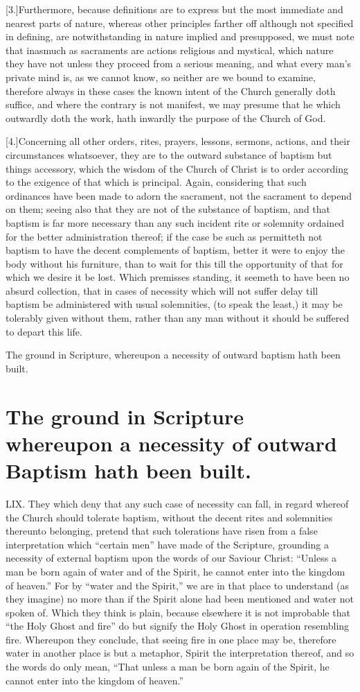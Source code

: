 [3.]Furthermore, because definitions are to express but the  most immediate and nearest parts of nature,
 whereas other principles farther off although not specified in defining, are notwithstanding in nature implied and presupposed, we must note that inasmuch as sacraments are actions religious and mystical, which nature they have not unless they proceed from a serious meaning, and what every man’s private mind is, as we cannot know, so neither are we bound to examine, therefore always in these cases the known intent of the Church generally doth suffice, and where the contrary is not manifest, we may presume that he which outwardly doth the work, hath inwardly the purpose of the Church of God.

[4.]Concerning all other orders, rites, prayers, lessons, sermons, actions, and their circumstances whatsoever, they are to the outward substance of baptism but things accessory, which the wisdom of the Church of Christ is to order according to  the exigence of that which is principal.
 Again, considering that such ordinances have been made to adorn the sacrament, not the sacrament to depend on them; seeing also that they are not of the substance of baptism, and that baptism is far more necessary than any such incident rite or solemnity ordained for the better administration thereof; if the case be such as permitteth not baptism to have the decent complements of baptism, better it were to enjoy the body without his furniture, than to wait for this till the opportunity of that for which we desire it be lost. Which premisses standing, it seemeth to have been no absurd collection, that in cases of necessity which will not suffer delay till baptism be administered with usual solemnities, (to speak the least,) it may be tolerably given without them, rather than any man without it should be suffered to depart this life.


The ground in Scripture, whereupon a necessity of outward baptism hath been built.
\section*{The ground in Scripture whereupon a necessity of outward Baptism hath been built.}
LIX. They which deny that any such case of necessity can fall, in regard whereof the Church should tolerate baptism, without the decent rites and solemnities thereunto belonging, pretend that such tolerations have risen from a false interpretation which “certain men” have made of the Scripture, grounding a necessity of external baptism upon the words of our Saviour Christ: “Unless a man be born again of water and of the Spirit, he cannot enter into the kingdom of heaven.” For by “water and the Spirit,” we are in that  place to understand (as they imagine) no more than if the Spirit alone had been mentioned and water not spoken of.
 Which they think is plain, because elsewhere it is not improbable that “the Holy Ghost and fire” do but signify the Holy Ghost in operation resembling fire. Whereupon they conclude, that seeing fire in one place may be, therefore water in another place is but a metaphor, Spirit the interpretation thereof, and so the words do only mean, “That unless a man be born again of the Spirit, he cannot enter into the kingdom of heaven.”

